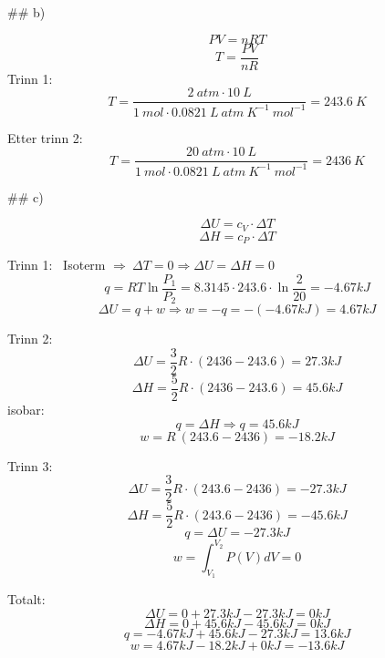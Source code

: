## b)

$$ P V = n R T $$
$$ T = \frac{PV}{nR} $$
Trinn 1:
$$ T = \frac{2\ atm ⋅ 10\ L}{1\ mol ⋅ 0.0821\ L\ atm\ K^{-1}\ mol^{-1}}
= 243.6\ K
$$

Etter trinn 2:
$$
T = \frac{20\ atm ⋅ 10\ L}{1\ mol ⋅ 0.0821\ L\ atm\ K^{-1}\ mol^{-1}} = 2436\ K
$$

## c)

$$ \Delta U = c_V ⋅ \Delta T $$
$$ \Delta H = c_P ⋅ \Delta T $$


Trinn 1:
\
Isoterm $⇒\ ΔT = 0 ⇒ ΔU = ΔH = 0$
$$
q = R T \ln{\frac{P_1}{P_2}}
= 8.3145 ⋅ 243.6 ⋅ \ln{\frac{2}{20}} = -4.67 kJ
$$
$$ΔU = q + w ⇒ w = -q = - (- 4.67 kJ) = 4.67 kJ$$


Trinn 2:
\
$$ \Delta U = \frac{3}{2} R ⋅ (2436 - 243.6) = 27.3 kJ $$
$$ \Delta H = \frac{5}{2} R ⋅ (2436 - 243.6) = 45.6 kJ $$
isobar:
$$ q = \Delta H ⇒ q = 45.6 kJ $$
$$ w = R\ (243.6 - 2436) = -18.2 kJ $$


Trinn 3:
\
$$ \Delta U = \frac{3}{2} R ⋅ (243.6 - 2436) = - 27.3 kJ $$
$$ \Delta H = \frac{5}{2} R ⋅ (243.6 - 2436) = - 45.6 kJ $$
$$ q = \Delta U = - 27.3kJ $$
$$ w = \int_{V_1}^{V_2}{P(V) dV} = 0 $$


Totalt:
\
$$ \Delta U = 0 + 27.3 kJ - 27.3 kJ = 0 kJ $$
$$ \Delta H = 0 + 45.6 kJ - 45.6 kJ = 0 kJ $$
$$ q = -4.67 kJ + 45.6 kJ - 27.3 kJ = 13.6 kJ $$
$$ w = 4.67 kJ - 18.2 kJ + 0 kJ = -13.6 kJ $$